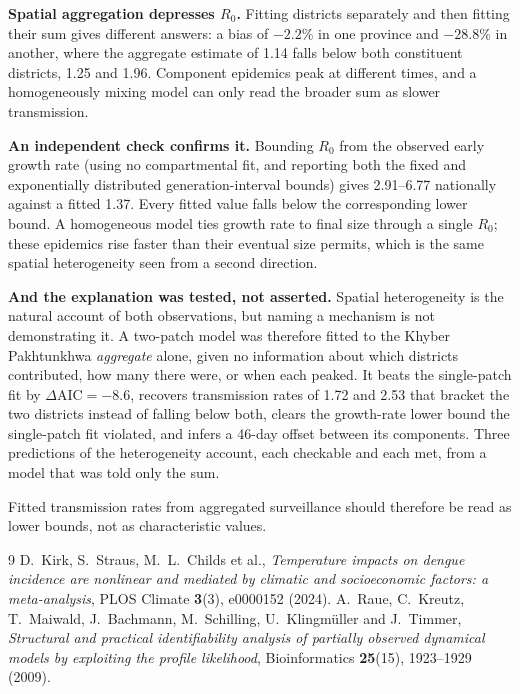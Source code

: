 \documentclass[11pt,a4paper]{article}
\begin{document}
\textbf{Spatial aggregation depresses $R_0$.} Fitting districts separately and
then fitting their sum gives different answers: a bias of $-2.2\%$ in one
province and $-28.8\%$ in another, where the aggregate estimate of 1.14 falls
below both constituent districts, 1.25 and 1.96. Component epidemics peak at
different times, and a homogeneously mixing model can only read the broader sum as
slower transmission.

\textbf{An independent check confirms it.} Bounding $R_0$ from the observed early
growth rate (using no compartmental fit, and reporting both the fixed and
exponentially distributed generation-interval bounds) gives 2.91--6.77
nationally against a fitted 1.37. Every fitted value falls below the corresponding
lower bound. A homogeneous model ties growth rate to final size through a single
$R_0$; these epidemics rise faster than their eventual size permits, which is the
same spatial heterogeneity seen from a second direction.

\textbf{And the explanation was tested, not asserted.} Spatial heterogeneity is
the natural account of both observations, but naming a mechanism is not
demonstrating it. A two-patch model was therefore fitted to the Khyber
Pakhtunkhwa \emph{aggregate} alone, given no information about which districts
contributed, how many there were, or when each peaked. It beats the single-patch
fit by $\Delta\mathrm{AIC} = -8.6$, recovers transmission rates of 1.72 and 2.53
that bracket the two districts instead of falling below both, clears the
growth-rate lower bound the single-patch fit violated, and infers a 46-day offset
between its components. Three predictions of the heterogeneity account, each
checkable and each met, from a model that was told only the sum.

Fitted transmission rates from aggregated surveillance should therefore be read as
lower bounds, not as characteristic values.

\begin{thebibliography}{9}
 D.~Kirk, S.~Straus, M.~L.~Childs et al., \emph{Temperature
impacts on dengue incidence are nonlinear and mediated by climatic and
socioeconomic factors: a meta-analysis}, PLOS Climate \textbf{3}(3), e0000152
(2024).
 A.~Raue, C.~Kreutz, T.~Maiwald, J.~Bachmann, M.~Schilling,
U.~Klingm\"uller and J.~Timmer, \emph{Structural and practical identifiability
analysis of partially observed dynamical models by exploiting the profile
likelihood}, Bioinformatics \textbf{25}(15), 1923--1929 (2009).
\end{thebibliography}
\end{document}
